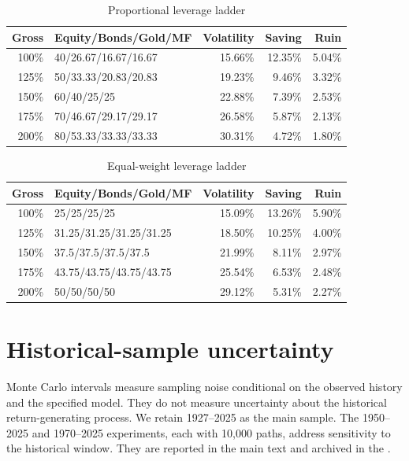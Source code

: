 \begin{table}[H]
\centering
\caption{Proportional leverage ladder}
\label{tab:60402525-ladder}
\small
\begin{tabular}{rlrrr}
\toprule
Gross & Equity/Bonds/Gold/MF & Volatility & Saving & Ruin \\
\midrule
100\% & 40/26.67/16.67/16.67 & 15.66\% & 12.35\% & 5.04\% \\
125\% & 50/33.33/20.83/20.83 & 19.23\% & 9.46\% & 3.32\% \\
150\% & 60/40/25/25 & 22.88\% & 7.39\% & 2.53\% \\
175\% & 70/46.67/29.17/29.17 & 26.58\% & 5.87\% & 2.13\% \\
200\% & 80/53.33/33.33/33.33 & 30.31\% & 4.72\% & 1.80\% \\
\bottomrule
\end{tabular}
\par{}
\end{table}
\begin{table}[H]
\centering
\caption{Equal-weight leverage ladder}
\label{tab:equal-ladder}
\small
\begin{tabular}{rlrrr}
\toprule
Gross & Equity/Bonds/Gold/MF & Volatility & Saving & Ruin \\
\midrule
100\% & 25/25/25/25 & 15.09\% & 13.26\% & 5.90\% \\
125\% & 31.25/31.25/31.25/31.25 & 18.50\% & 10.25\% & 4.00\% \\
150\% & 37.5/37.5/37.5/37.5 & 21.99\% & 8.11\% & 2.97\% \\
175\% & 43.75/43.75/43.75/43.75 & 25.54\% & 6.53\% & 2.48\% \\
200\% & 50/50/50/50 & 29.12\% & 5.31\% & 2.27\% \\
\bottomrule
\end{tabular}
\par{}
\end{table}

\section{Historical-sample uncertainty}
\label{app:historical-uncertainty}
Monte Carlo intervals measure sampling noise conditional on the observed
history and the specified model. They do not measure uncertainty about the
historical return-generating process. We retain 1927--2025 as the main
sample. The 1950--2025 and 1970--2025 experiments, each with
10,000 paths, address sensitivity to the historical window. They are
reported in the main text and archived in the
.

